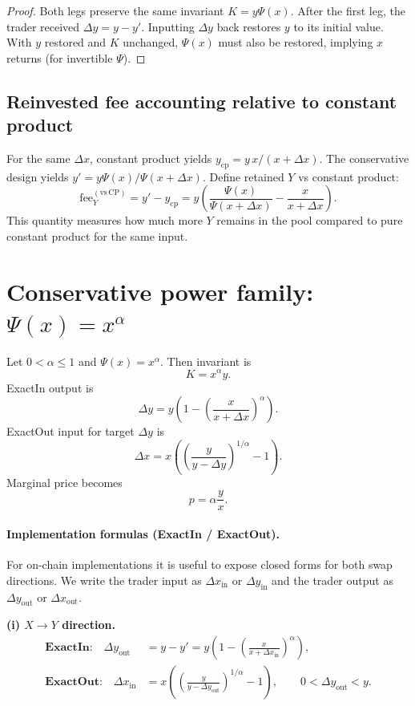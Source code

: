 \documentclass[11pt]{article}
\theoremstyle{definition}
\theoremstyle{remark}
\newcommand{\dx}{\Delta x}
\newcommand{\dy}{\Delta y}
\begin{document}
\begin{proof}
Both legs preserve the same invariant $K=y\Psi(x)$. After the first leg, the trader received $\dy=y-y'$. Inputting $\dy$ back restores $y$ to its initial value. With $y$ restored and $K$ unchanged, $\Psi(x)$ must also be restored, implying $x$ returns (for invertible $\Psi$).
\end{proof}

\subsection{Reinvested fee accounting relative to constant product}

For the same $\dx$, constant product yields $y_{\mathrm{cp}}=y\,x/(x+\dx)$. The conservative design yields $y'=y\Psi(x)/\Psi(x+\dx)$.
Define retained $Y$ vs constant product:
\[
\boxed{\mathrm{fee}_Y^{(\mathrm{vs\,CP})}=y' - y_{\mathrm{cp}} = y\left(\frac{\Psi(x)}{\Psi(x+\dx)}-\frac{x}{x+\dx}\right).}
\]
This quantity measures how much more $Y$ remains in the pool compared to pure constant product for the same input.

\section{Conservative power family: $\Psi(x)=x^\alpha$}

Let $0<\alpha\le 1$ and $\Psi(x)=x^\alpha$. Then invariant is
\[
\boxed{K=x^\alpha y.}
\]
ExactIn output is
\[
\boxed{\Delta y = y\left(1-\left(\frac{x}{x+\dx}\right)^\alpha\right).}
\]
ExactOut input for target $\dy$ is
\[
\boxed{\dx = x\left(\left(\frac{y}{y-\dy}\right)^{1/\alpha}-1\right).}
\]
Marginal price becomes
\[
\boxed{p=\alpha\frac{y}{x}.}
\]


\paragraph{Implementation formulas (ExactIn / ExactOut).}
For on-chain implementations it is useful to expose closed forms for both swap directions.
We write the trader input as \(\dx_{\mathrm{in}}\) or \(\dy_{\mathrm{in}}\) and the trader output as \(\dy_{\mathrm{out}}\) or \(\dx_{\mathrm{out}}\).

\textbf{(i) \(X \to Y\) direction.}
\begin{align}
\textbf{ExactIn:}\quad
\dy_{\mathrm{out}}
&= y - y'
= y\left(1 - \left(\frac{x}{x+\dx_{\mathrm{in}}}\right)^{\alpha}\right),
\\[4pt]
\textbf{ExactOut:}\quad
\dx_{\mathrm{in}}
&= x\left(\left(\frac{y}{y-\dy_{\mathrm{out}}}\right)^{1/\alpha}-1\right),
\qquad 0<\dy_{\mathrm{out}}<y.
\end{align}
\end{document}
